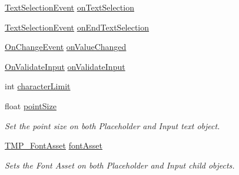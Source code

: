 \begin{DoxyCompactItemize}
\item 
\mbox{\hyperlink{class_t_m_pro_1_1_t_m_p___input_field_1_1_text_selection_event}{Text\+Selection\+Event}} \mbox{\hyperlink{class_t_m_pro_1_1_t_m_p___input_field_af1c52092e530ca45a1af4f2653fe320b}{on\+Text\+Selection}}
\item 
\mbox{\hyperlink{class_t_m_pro_1_1_t_m_p___input_field_1_1_text_selection_event}{Text\+Selection\+Event}} \mbox{\hyperlink{class_t_m_pro_1_1_t_m_p___input_field_a367d020208ed8d2d01f25e7c46b2806e}{on\+End\+Text\+Selection}}
\item 
\mbox{\hyperlink{class_t_m_pro_1_1_t_m_p___input_field_1_1_on_change_event}{On\+Change\+Event}} \mbox{\hyperlink{class_t_m_pro_1_1_t_m_p___input_field_aaf909cd0451dbaa7fc816c22aba484b4}{on\+Value\+Changed}}
\item 
\mbox{\hyperlink{class_t_m_pro_1_1_t_m_p___input_field_a34dece90fcdb81bf3489208eab7a8a82}{On\+Validate\+Input}} \mbox{\hyperlink{class_t_m_pro_1_1_t_m_p___input_field_aee71958e449b48fa7df100ca8c9c5409}{on\+Validate\+Input}}
\item 
int \mbox{\hyperlink{class_t_m_pro_1_1_t_m_p___input_field_a973f5c94811ee85dad28d96193fb925e}{character\+Limit}}
\item 
float \mbox{\hyperlink{class_t_m_pro_1_1_t_m_p___input_field_a1ac8a2780c0a65e2ed41fd216d0c4454}{point\+Size}}
\begin{DoxyCompactList}\small\item\em Set the point size on both Placeholder and Input text object. \end{DoxyCompactList}\item 
\mbox{\hyperlink{class_t_m_pro_1_1_t_m_p___font_asset}{T\+M\+P\+\_\+\+Font\+Asset}} \mbox{\hyperlink{class_t_m_pro_1_1_t_m_p___input_field_ac13a97bd7e0eb0e19b5a50efc11adb67}{font\+Asset}}
\begin{DoxyCompactList}\small\item\em Sets the Font Asset on both Placeholder and Input child objects. \end{DoxyCompactList}\item 

\end{DoxyCompactItemize}
